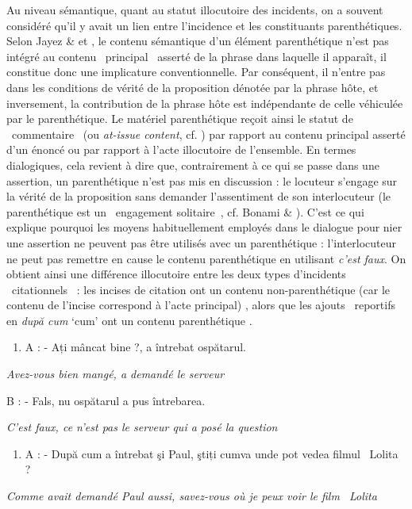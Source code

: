Au niveau sémantique, quant au statut illocutoire des incidents, on a souvent considéré qu'il y avait un lien entre l'incidence et les constituants parenthétiques. Selon Jayez \& \citet{Rossari2004} et \citet{Potts2005}, le contenu sémantique d'un élément parenthétique n'est pas intégré au contenu {\guillemotleft}~principal~{\guillemotright} asserté de la phrase dans laquelle il apparaît, il constitue donc une implicature conventionnelle. Par conséquent, il n'entre pas dans les conditions de vérité de la proposition dénotée par la phrase hôte, et inversement, la contribution de la phrase hôte est indépendante de celle véhiculée par le parenthétique. Le matériel parenthétique reçoit ainsi le statut de {\guillemotleft}~commentaire~{\guillemotright} (ou \textit{at-issue content}, cf. \citet{Potts2005}) par rapport au contenu principal asserté d'un énoncé ou par rapport à l'acte illocutoire de l'ensemble. En termes dialogiques, cela revient à dire que, contrairement à ce qui se passe dans une assertion, un parenthétique n'est pas mis en discussion : le locuteur s'engage sur la vérité de la proposition sans demander l'assentiment de son interlocuteur (le parenthétique est un {\guillemotleft}~engagement solitaire~{\guillemotright}, cf. Bonami \& \citet{Godard2008d}). C'est ce qui explique pourquoi les moyens habituellement employés dans le dialogue pour nier une assertion ne peuvent pas être utilisés avec un parenthétique : l'interlocuteur ne peut pas remettre en cause le contenu parenthétique en utilisant \textit{c'est faux}. On obtient ainsi une différence illocutoire entre les deux types d'incidents {\guillemotleft}~citationnels~{\guillemotright} : les incises de citation ont un contenu non-parenthétique (car le contenu de l'incise correspond à l'acte principal) , alors que les ajouts {\guillemotleft}~reportifs~{\guillemotright} en \textit{după cum} `cum' ont un contenu parenthétique .  


\begin{enumerate}
\item \label{bkm:Ref275769598}A :  - Ați mâncat bine ?, a întrebat ospătarul. 


\end{enumerate}
{\itshape
Avez-vous bien mangé, a demandé le serveur}

  B :  - Fals, nu ospătarul a pus întrebarea.

{\itshape
C'est faux, ce n'est pas le serveur qui a posé la question}


\begin{enumerate}
\item \label{bkm:Ref275769602}A :  - După cum a întrebat şi Paul, ştiți cumva unde pot vedea filmul {\guillemotleft}~Lolita~{\guillemotright} ? 


\end{enumerate}
{\itshape
Comme avait demandé Paul aussi, savez-vous où je peux voir le film {\guillemotleft}~Lolita~{\guillemotright}}

